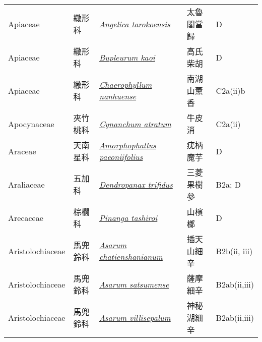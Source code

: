 {\begin{longtable}{p{2.5cm}p{2.5cm}p{4.5cm}p{2.5cm}p{3cm}}
    Apiaceae & 繖形科 & \href{http://www.theplantlist.org/tpl1.1/search?q=Angelica+tarokoensis}{\textit{Angelica tarokoensis} } & 太魯閣當歸 & D \index{Angelica@\textit{Angelica}!tarokoensis@\textit{tarokoensis}}  \index{太魯閣當歸} \\
    Apiaceae & 繖形科 & \href{http://www.theplantlist.org/tpl1.1/search?q=Bupleurum+kaoi}{\textit{Bupleurum kaoi} } & 高氏柴胡 & D \index{Bupleurum@\textit{Bupleurum}!kaoi@\textit{kaoi}}  \index{高氏柴胡} \\
    Apiaceae & 繖形科 & \href{http://www.theplantlist.org/tpl1.1/search?q=Chaerophyllum+nanhuense}{\textit{Chaerophyllum nanhuense} } & 南湖山薰香 & C2a(ii)b \index{Chaerophyllum@\textit{Chaerophyllum}!nanhuense@\textit{nanhuense}}  \index{南湖山薰香} \\
    Apocynaceae & 夾竹桃科 & \href{http://www.theplantlist.org/tpl1.1/search?q=Cynanchum+atratum}{\textit{Cynanchum atratum} } & 牛皮消 & C2a(ii) \index{Cynanchum@\textit{Cynanchum}!atratum@\textit{atratum}}  \index{牛皮消} \\
    Araceae & 天南星科 & \href{http://www.theplantlist.org/tpl1.1/search?q=Amorphophallus+paeoniifolius}{\textit{Amorphophallus paeoniifolius} } & 疣柄魔芋 & D \index{Amorphophallus@\textit{Amorphophallus}!paeoniifolius@\textit{paeoniifolius}}  \index{疣柄魔芋} \\
    Araliaceae & 五加科 & \href{http://www.theplantlist.org/tpl1.1/search?q=Dendropanax+trifidus}{\textit{Dendropanax trifidus} } & 三菱果樹參 & B2a; D \index{Dendropanax@\textit{Dendropanax}!trifidus@\textit{trifidus}}  \index{三菱果樹參} \\
    Arecaceae & 棕櫚科 & \href{http://www.theplantlist.org/tpl1.1/search?q=Pinanga+tashiroi}{\textit{Pinanga tashiroi} } & 山檳榔 & D \index{Pinanga@\textit{Pinanga}!tashiroi@\textit{tashiroi}}  \index{山檳榔} \\
    Aristolochiaceae & 馬兜鈴科 & \href{http://www.theplantlist.org/tpl1.1/search?q=Asarum+chatienshanianum}{\textit{Asarum chatienshanianum} } & 插天山細辛 & B2b(ii, iii) \index{Asarum@\textit{Asarum}!chatienshanianum@\textit{chatienshanianum}}  \index{插天山細辛} \\
    Aristolochiaceae & 馬兜鈴科 & \href{http://www.theplantlist.org/tpl1.1/search?q=Asarum+satsumense}{\textit{Asarum satsumense} } & 薩摩細辛 & B2ab(ii,iii) \index{Asarum@\textit{Asarum}!satsumense@\textit{satsumense}}  \index{薩摩細辛} \\
    Aristolochiaceae & 馬兜鈴科 & \href{http://www.theplantlist.org/tpl1.1/search?q=Asarum+villisepalum}{\textit{Asarum villisepalum} } & 神秘湖細辛 & B2ab(ii,iii) \index{Asarum@\textit{Asarum}!villisepalum@\textit{villisepalum}}  \index{神秘湖細辛} \\

\end{longtable}}
